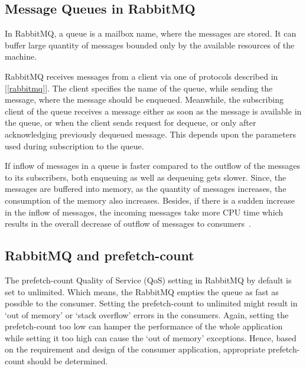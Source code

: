   \subsection{Message Queues in RabbitMQ}
  In RabbitMQ, a queue is a mailbox name, where the messages are stored. It can buffer large quantity of messages bounded only by the available resources of the machine.

  RabbitMQ receives messages from a client via one of protocols described in [\autoref{rabbitmq}]. The client specifies the name of the queue, while sending the message, where the message should be enqueued. Meanwhile, the subscribing client of the queue receives a message either as soon as the message is available in the queue, or when the client sends request for dequeue, or only after acknowledging previously dequeued message. This depends upon the parameters used during subscription to the queue.

  If inflow of messages in a queue is faster compared to the outflow of the messages to its subscribers, both enqueuing as well as dequeuing gets slower. Since, the messages are buffered into memory, as the quantity of messages increases, the consumption of the memory also increases. Besides, if there is a sudden increase in the inflow of messages, the incoming messages take more CPU time which results in the overall decrease of outflow of messages to consumers~\cite{sizingYourRabbits}.

  \subsection{RabbitMQ and prefetch-count}
  \label{subsec:rabbitmqPrefetch}
  The prefetch-count Quality of Service (QoS) setting in RabbitMQ by default is set to unlimited. Which means, the RabbitMQ empties the queue as fast as possible to the consumer. Setting the prefetch-count to unlimited might result in ‘out of memory’ or ‘stack overflow’ errors in the consumers. Again, setting the prefetch-count too low can hamper the performance of the whole application while setting it too high can cause the ‘out of memory’ exceptions. Hence, based on the requirement and design of the consumer application, appropriate prefetch-count should be determined.

